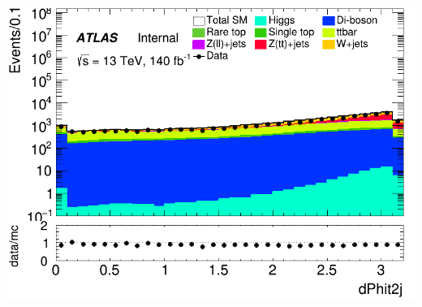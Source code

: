 \documentclass[usenames,dvipsnames]{beamer}
\begin{document}
\begin{frame}
\begin{minipage}{0.32\textwidth}
        \includegraphics[width=\textwidth]{graphics/L_met/L_met_dPhit2j.png}
    \end{minipage}
    
    \vspace{0.5cm} %


\end{frame}
\end{document}
